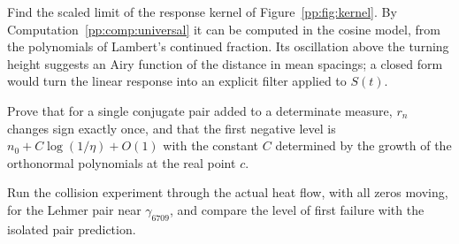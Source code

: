 \begin{openproblem}
Find the scaled limit of the response kernel of Figure~\ref{pp:fig:kernel}. By Computation~\ref{pp:comp:universal} it can be computed in the cosine model, from the polynomials of Lambert's continued fraction. Its oscillation above the turning height suggests an Airy function of the distance in mean spacings; a closed form would turn the linear response into an explicit filter applied to $S(t)$.
\end{openproblem}

\begin{openproblem}
Prove that for a single conjugate pair added to a determinate measure, $r_n$ changes sign exactly once, and that the first negative level is $n_0+C\log(1/\eta)+O(1)$ with the constant $C$ determined by the growth of the orthonormal polynomials at the real point $c$.
\end{openproblem}

\begin{openproblem}
Run the collision experiment through the actual heat flow, with all zeros moving, for the Lehmer pair near $\gamma_{6709}$, and compare the level of first failure with the isolated pair prediction.
\end{openproblem}
